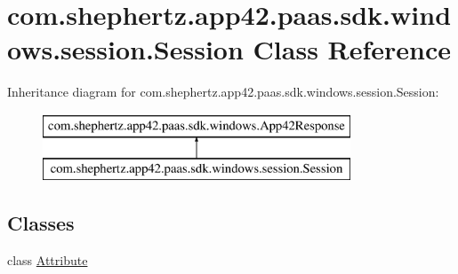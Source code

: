 \hypertarget{classcom_1_1shephertz_1_1app42_1_1paas_1_1sdk_1_1windows_1_1session_1_1_session}{\section{com.\+shephertz.\+app42.\+paas.\+sdk.\+windows.\+session.\+Session Class Reference}
\label{classcom_1_1shephertz_1_1app42_1_1paas_1_1sdk_1_1windows_1_1session_1_1_session}
}
Inheritance diagram for com.\+shephertz.\+app42.\+paas.\+sdk.\+windows.\+session.\+Session\+:\begin{figure}[H]
\begin{center}
\leavevmode
\includegraphics[height=2.000000cm]{classcom_1_1shephertz_1_1app42_1_1paas_1_1sdk_1_1windows_1_1session_1_1_session}
\end{center}
\end{figure}
\subsection*{Classes}
\begin{DoxyCompactItemize}
\item 
class \hyperlink{classcom_1_1shephertz_1_1app42_1_1paas_1_1sdk_1_1windows_1_1session_1_1_session_1_1_attribute}{Attribute}
\end{DoxyCompactItemize}
